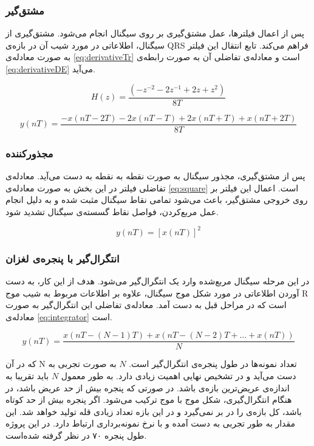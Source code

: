 \subsubsection{مشتق‌گیر}
پس از اعمال فیلترها، عمل مشتق‌گیری بر روی سیگنال انجام می‌شود. مشتق‌گیری از سیگنال، اطلاعاتی در مورد شیب آن در بازه‌ی QRS فراهم می‌کند. تابع انتقال این فیلتر به صورت معادله‌ی \ref{eq:derivativeTr} است و معادله‌ی تفاضلی آن به صورت رابطه‌ی \ref{eq:derivativeDE} می‌آید.

\begin{equation}
	H(z) = \frac{(-z^{-2}-2z^{-1}+2z+z^2)}{8T}
\label{eq:derivativeTr}
\end{equation}
	
\begin{equation}
	y(nT) = \frac{-x(nT-2T)-2x(nT-T)+2x(nT+T)+x(nT+2T)}{8T}
\label{eq:derivativeDE}
\end{equation}

\subsubsection{مجذورکننده}
پس از مشتق‌گیری، مجذور سیگنال به صورت نقطه به نقطه به دست می‌آید. معادله‌ی تفاضلی فیلتر در این بخش به صورت معادله‌ی \ref{eq:square} است. اعمال این فیلتر بر روی خروجی مشتق‌گیر، باعث می‌شود تمامی نقاط سیگنال مثبت شده و به دلیل انجام عمل مربع‌کردن، فواصل نقاط گسسته‌ی سیگنال تشدید شود.

\begin{equation}
	y(nT) = [x(nT)]^2
\label{eq:square}
\end{equation}

\subsubsection{انتگرال‌گیر با پنجره‌ی لغزان}
در این مرحله سیگنال مربع‌شده وارد یک انتگرال‌گیر می‌شود. هدف از این کار، به دست آوردن اطلاعاتی در مورد شکل موج سیگنال، علاوه بر اطلاعات مربوط به شیب موج R است که در مراحل قبل به دست آمد. معادله‌ی تفاضلی این انتگرال‌گیر به صورت معادله‌ی \ref{eq:integrator} است.

\begin{equation}
	y(nT) = \frac{x(nT-(N-1)T) + x(nT-(N-2)T+...+x(nT))}{N}
\label{eq:integrator}
\end{equation}

که در آن N تعداد نمونه‌ها در طول پنجره‌ی انتگرال‌گیر است. $N$ به صورت تجربی به دست می‌آید و در تشخیص نهایی  اهمیت زیادی دارد. به طور معمول $N$ باید تقریبا به اندازه‌ی عریض‌ترین بازه‌ی  باشد. در صورتی که پنجره بیش از حد عریض باشد، در هنگام انتگرال‌گیری، شکل موج  با موج  ترکیب می‌شود. اگر پنجره بیش از حد کوتاه باشد، کل بازه‌ی  را در بر نمی‌گیرد و در این بازه تعداد زیادی قله تولید خواهد شد. این مقدار به طور تجربی به دست آمده و با نرخ نمونه‌برداری ارتباط دارد. در این پروژه طول پنجره ۷۰ در نظر گرفته شده‌است.

